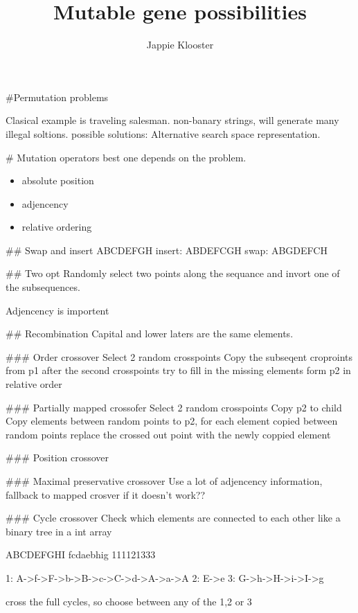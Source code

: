 \documentclass{article}
\begin{document}
\author{Jappie Klooster}
\title{Mutable gene possibilities}
\maketitle
#Permutation problems

Clasical example is traveling salesman.
non-banary strings, will generate many illegal soltions.
possible solutions:
	Alternative search space representation.

# Mutation operators
best one depends on the problem.

\begin{itemize}
	\item absolute position
	\item adjencency
	\item relative ordering
\end{itemize}

## Swap and insert
ABCDEFGH
	insert: ABDEFCGH
	swap:	ABGDEFCH

## Two opt
Randomly select two points along the sequance and invort one of the
subsequences.

\begin{prooftree}
\end{prooftree}

Adjencency is importent

## Recombination
Capital and lower laters are the same elements.

### Order crossover
Select 2 random crosspoints
Copy the subseqent croproints from p1
after the second crosspoints try to fill in the missing elements
form p2 in relative order

### Partially mapped crossofer
Select 2 random crosspoints
Copy p2 to child
Copy elements between random points to p2, for each element
copied between random points replace the crossed out point
with the newly coppied element

### Position crossover

### Maximal preservative crossover
Use a lot of adjencency information, fallback to mapped crosver if it doesn't
work??

### Cycle crossover
Check which elements are connected to each other like a binary tree in a
int array

ABCDEFGHI
fcdaebhig
111121333

1: A->f->F->b->B->c->C->d->A->a->A
2: E->e
3: G->h->H->i->I->g

cross the full cycles, so choose between any of the 1,2 or 3
\end{document}
